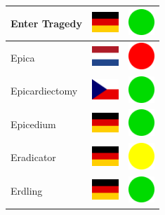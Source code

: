 \documentclass[12pt, a4paper, twoside]{report}
\begin{document}
\begin{center}
\begin{longtable}{|p{5cm}|p{2cm}|p{2cm}|}
Enter Tragedy & \includegraphics[width=1cm]{4x3/de} & \includegraphics[width=1cm]{likes/y} \\ \hline
Epica & \includegraphics[width=1cm]{4x3/nl} & \includegraphics[width=1cm]{likes/n} \\ \hline
Epicardiectomy & \includegraphics[width=1cm]{4x3/cz} & \includegraphics[width=1cm]{likes/y} \\ \hline
Epicedium & \includegraphics[width=1cm]{4x3/de} & \includegraphics[width=1cm]{likes/y} \\ \hline
Eradicator & \includegraphics[width=1cm]{4x3/de} & \includegraphics[width=1cm]{likes/m} \\ \hline
Erdling & \includegraphics[width=1cm]{4x3/de} & \includegraphics[width=1cm]{likes/y} \\ \hline

\end{longtable}
\end{center}
\end{document}

